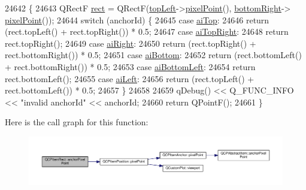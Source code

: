\begin{DoxyCode}
24642                                                         \{
24643   QRectF \hyperlink{_gen_blob_8m_aea8f6815d9a63491fc422c5572c6b3c3}{rect} = QRectF(\hyperlink{class_q_c_p_item_rect_aa70feeef173489b03c3fbe906a5023c4}{topLeft}->\hyperlink{class_q_c_p_item_position_ae490f9c76ee2ba33752c495d3b6e8fb5}{pixelPoint}(), \hyperlink{class_q_c_p_item_rect_a409f3bfe615a7e322bb3d4d193d85b26}{bottomRight}->
      \hyperlink{class_q_c_p_item_position_ae490f9c76ee2ba33752c495d3b6e8fb5}{pixelPoint}());
24644   \textcolor{keywordflow}{switch} (anchorId) \{
24645   \textcolor{keywordflow}{case} \hyperlink{class_q_c_p_item_rect_af0ebba58e6bca4851c4db726691ec0d3acaef33243034885d551dc9b8318ad326}{aiTop}:
24646     \textcolor{keywordflow}{return} (rect.topLeft() + rect.topRight()) * 0.5;
24647   \textcolor{keywordflow}{case} \hyperlink{class_q_c_p_item_rect_af0ebba58e6bca4851c4db726691ec0d3aa94843ce5935b36994005c1e1859ef60}{aiTopRight}:
24648     \textcolor{keywordflow}{return} rect.topRight();
24649   \textcolor{keywordflow}{case} \hyperlink{class_q_c_p_item_rect_af0ebba58e6bca4851c4db726691ec0d3a69fa21fde2f44036381296a6f78b4eb4}{aiRight}:
24650     \textcolor{keywordflow}{return} (rect.topRight() + rect.bottomRight()) * 0.5;
24651   \textcolor{keywordflow}{case} \hyperlink{class_q_c_p_item_rect_af0ebba58e6bca4851c4db726691ec0d3a2d294551e07179c4ac0c4e37364a1468}{aiBottom}:
24652     \textcolor{keywordflow}{return} (rect.bottomLeft() + rect.bottomRight()) * 0.5;
24653   \textcolor{keywordflow}{case} \hyperlink{class_q_c_p_item_rect_af0ebba58e6bca4851c4db726691ec0d3ab3c42dbb1709a04ba9b03dcbf5a2537a}{aiBottomLeft}:
24654     \textcolor{keywordflow}{return} rect.bottomLeft();
24655   \textcolor{keywordflow}{case} \hyperlink{class_q_c_p_item_rect_af0ebba58e6bca4851c4db726691ec0d3a8a095c6d6b2e7665a15d9f40c94b47dc}{aiLeft}:
24656     \textcolor{keywordflow}{return} (rect.topLeft() + rect.bottomLeft()) * 0.5;
24657   \}
24658 
24659   qDebug() << Q\_FUNC\_INFO << \textcolor{stringliteral}{"invalid anchorId"} << anchorId;
24660   \textcolor{keywordflow}{return} QPointF();
24661 \}
\end{DoxyCode}


Here is the call graph for this function\+:\nopagebreak
\begin{figure}[H]
\begin{center}
\leavevmode
\includegraphics[width=350pt]{class_q_c_p_item_rect_ae0973f8281fb52361b0c99ee899be07e_cgraph}
\end{center}
\end{figure}


